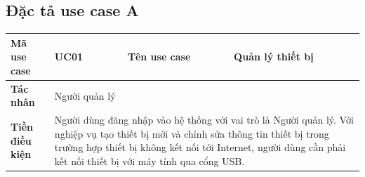 \documentclass[../DoAn.tex]{subfiles}
\begin{document}
\subsection{Đặc tả use case A}

\begin{longtable}{|l|l|l|p{6cm}|}
    \hline
    \textbf{Mã use case} & UC01 & \textbf{Tên use case} & Quản lý thiết bị \\ \hline

    \textbf{Tác nhân} & \multicolumn{3}{l|}{Người quản lý} \\ \hline

    \textbf{Tiền điều kiện} & \multicolumn{3}{p{12cm}|}{Người dùng đăng nhập vào hệ thống với vai trò là Người quản lý. Với nghiệp vụ tạo thiết bị mới và chỉnh sửa thông tin thiết bị trong trường hợp thiết bị không kết nối tới Internet, người dùng cần phải kết nối thiết bị với máy tính qua cổng USB.} \\ \hline



\end{longtable}
\end{document}
